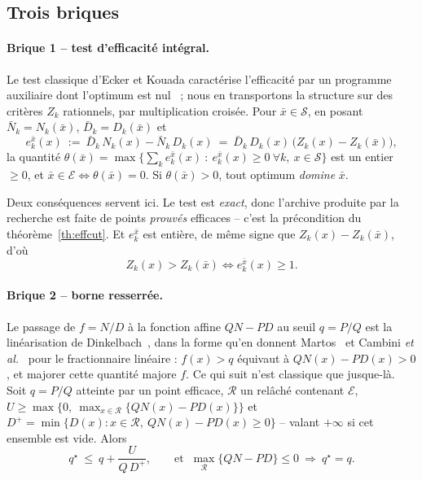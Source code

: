 \documentclass[11pt,a4paper]{article}
\theoremstyle{plain}
\theoremstyle{remark}
\newcommand{\Zk}{Z_k}
\newcommand{\Nk}{N_k}
\newcommand{\Dk}{D_k}
\newcommand{\Ecal}{\mathcal{E}}
\newcommand{\Scal}{\mathcal{S}}
\newcommand{\Rcal}{\mathcal{R}}
\newcommand{\qs}{q^{\star}}
\begin{document}
\subsection{Trois briques}

\paragraph{Brique 1 -- test d'efficacité intégral.} Le test classique
d'Ecker et Kouada caractérise l'efficacité par un programme auxiliaire dont
l'optimum est nul~\cite{ecker1975} ; nous en transportons la structure sur
des critères $\Zk$ rationnels, par multiplication croisée. Pour
$\bar x\in\Scal$, en
posant $\bar N_k=\Nk(\bar x)$, $\bar D_k=\Dk(\bar x)$ et
\[
  e^{\bar x}_k(x)\ :=\ \bar D_k\,\Nk(x)-\bar N_k\,\Dk(x)
   \ =\ \bar D_k\,\Dk(x)\,\bigl(\Zk(x)-\Zk(\bar x)\bigr),
\]
la quantité $\theta(\bar x)=\max\bigl\{\sum_k e^{\bar x}_k(x)\ :\
e^{\bar x}_k(x)\ge 0\ \forall k,\ x\in\Scal\bigr\}$ est un entier
$\ge 0$, et $\bar x\in\Ecal\iff\theta(\bar x)=0$. Si $\theta(\bar x)>0$,
tout optimum \emph{domine} $\bar x$.

Deux conséquences servent ici. Le test est \emph{exact}, donc l'archive
produite par la recherche est faite de points \emph{prouvés} efficaces --
c'est la précondition du théorème~\ref{th:effcut}. Et $e^{\bar x}_k$ est
entière, de même signe que $\Zk(x)-\Zk(\bar x)$, d'où
\begin{equation}\label{eq:eint}
  \Zk(x)>\Zk(\bar x)\iff e^{\bar x}_k(x)\ge 1 .
\end{equation}

\paragraph{Brique 2 -- borne resserrée.} Le passage de
$f=N/D$ à la fonction affine $QN-PD$ au seuil $q=P/Q$ est la
linéarisation de Dinkelbach~\cite{dinkelbach1967}, dans la forme qu'en
donnent Martos~\cite{martos1964} et Cambini \emph{et
al.}~\cite{cambini1992} pour le fractionnaire linéaire : $f(x)>q$ équivaut
à $QN(x)-PD(x)>0$, et majorer cette quantité majore $f$. Ce qui suit
n'est classique que jusque-là. Soit $q=P/Q$ atteinte par un point
efficace, $\Rcal$ un relâché contenant $\Ecal$,
$U\ge\max\bigl\{0,\ \max_{x\in\Rcal}\{QN(x)-PD(x)\}\bigr\}$ et
$D^{+}=\min\{D(x):x\in\Rcal,\ QN(x)-PD(x)\ge 0\}$ -- valant $+\infty$ si cet
ensemble est vide. Alors
\begin{equation}\label{eq:borne}
  \qs\ \le\ q+\frac{U}{Q\,D^{+}},
  \qquad\text{et }\ \max_{\Rcal}\{QN-PD\}\le 0\ \Rightarrow\ \qs=q .
\end{equation}
\end{document}
